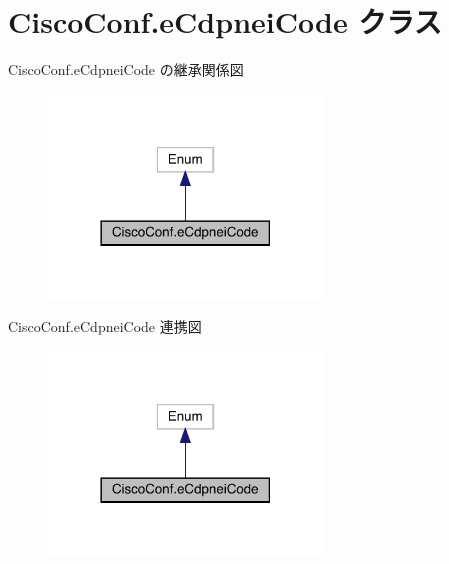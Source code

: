 \hypertarget{classCiscoConf_1_1eCdpneiCode}{}\section{Cisco\+Conf.\+e\+Cdpnei\+Code クラス}
\label{classCiscoConf_1_1eCdpneiCode}


Cisco\+Conf.\+e\+Cdpnei\+Code の継承関係図
\nopagebreak
\begin{figure}[H]
\begin{center}
\leavevmode
\includegraphics[width=206pt]{classCiscoConf_1_1eCdpneiCode__inherit__graph}
\end{center}
\end{figure}


Cisco\+Conf.\+e\+Cdpnei\+Code 連携図
\nopagebreak
\begin{figure}[H]
\begin{center}
\leavevmode
\includegraphics[width=206pt]{classCiscoConf_1_1eCdpneiCode__coll__graph}
\end{center}
\end{figure}
